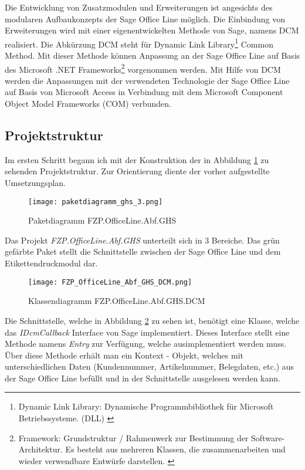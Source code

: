 Die Entwicklung von Zusatzmodulen und Erweiterungen ist angesichts des modularen 
Aufbaukonzepts der Sage Office Line möglich. Die Einbindung von Erweiterungen wird 
mit einer eigenentwickelten Methode von Sage, namens DCM realisiert. Die Abkürzung
DCM steht für Dynamic Link Library\footnote{\label{foot:dll}Dynamic Link Library: 
Dynamische Programmbibliothek für Microsoft Betriebssysteme. (DLL) \cite{dll}} 
Common Method. Mit dieser Methode können Anpassung an der Sage Office Line auf Basis
des Microsoft .NET Frameworks\footnote{\label{foot:framework}Framework: Grundstruktur 
/ Rahmenwerk zur Bestimmung der Software-Architektur. Es besteht aus mehreren Klassen, 
die zusammenarbeiten und wieder verwendbare Entwürfe darstellen. \cite{framework}} 
vorgenommen werden. Mit Hilfe von DCM werden die Anpassungen mit der verwendeten 
Technologie der Sage Office Line auf Basis von Microsoft Access in Verbindung mit dem
Microsoft Component Object Model Frameworks (COM) verbunden.

\subsection{Projektstruktur}
Im ersten Schritt begann ich mit der Konstruktion der in Abbildung \ref{fig:paketdiagrammghs}
zu sehenden Projektstruktur. Zur Orientierung diente der vorher aufgestellte Umsetzungsplan.

\begin{figure}[H]
    \centering
    \texttt{[image: paketdiagramm\_ghs\_3.png]}
    \caption[Paketdiagramm FZP.OfficeLine.Abf.GHS]
    {\small{Paketdiagramm FZP.OfficeLine.Abf.GHS}}
    \label{fig:paketdiagrammghs}
\end{figure}

\noindent
Das Projekt \emph{FZP.OfficeLine.Abf.GHS} unterteilt sich in 3 Bereiche. Das grün gefärbte
Paket stellt die Schnittstelle zwischen der Sage Office Line und dem Etikettendruckmodul 
dar. 

\begin{figure}[H]
    \centering
    \texttt{[image: FZP\_OfficeLine\_Abf\_GHS\_DCM.png]}
    \caption[Klassendiagramm FZP.OfficeLine.Abf.GHS.DCM]
    {\small{Klassendiagramm FZP.OfficeLine.Abf.GHS.DCM}}
    \label{fig:kddcm}
\end{figure}

\noindent
Die Schnittstelle, welche in Abbildung \ref{fig:kddcm} zu sehen ist, benötigt eine Klasse, 
welche das \emph{IDcmCallback} Interface von Sage implementiert. Dieses Interface stellt eine 
Methode namens \emph{Entry} zur Verfügung, welche ausimplementiert werden muss. Über diese 
Methode erhält man ein Kontext - Objekt, welches mit unterschiedlichen Daten (Kundennummer, 
Artikelnummer, Belegdaten, etc.) aus der Sage Office Line befüllt und in der Schnittstelle 
ausgelesen werden kann. 

